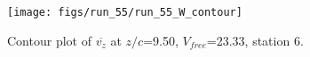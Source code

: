 \begin{figure}[H]
\centering
\texttt{[image: figs/run\_55/run\_55\_W\_contour]}
\caption{Contour plot of $\overline{v_{z}}$ at $z/c$=9.50, $V_{free}$=23.33, station 6.}
\label{fig:run_55_W_contour}
\end{figure}


